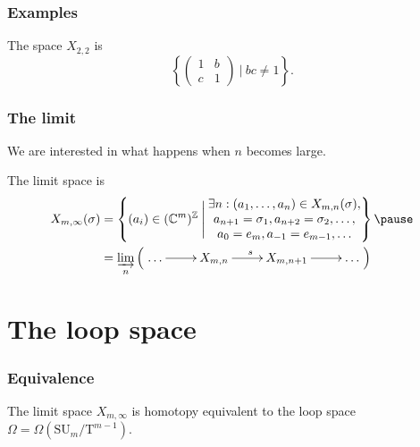\documentclass{beamer} %
\newcommand{\Z}{\mathbb{Z}}
\newcommand{\C}{\mathbb{C}}
\newcommand{\delim}{\:}
\newcommand{\SU}{\mathrm{SU}}
\newcommand{\T}{\mathrm{T}}
\newcommand{\set}[1]{\left\{ #1 \right\}}
\begin{document}
\begin{frame}
  \frametitle{Examples}
  \begin{example}
    The space $X_{2,2}$ is
    \[ \set{
      \begin{pmatrix}
        1 & b \\
        c & 1
      \end{pmatrix} \delim\bigg\vert\delim bc \neq 1 }.\]
  \end{example}
\end{frame}

\begin{frame}
  \frametitle{The limit}
  We are interested in what happens when $n$ becomes large.
  \begin{definition}
    The limit space is
    \begin{align*}
      X_{m,\infty}(\sigma) &= \set{(a_i) \in (\C^m)^\Z
                             \delim\Bigg\vert\delim
                             \begin{matrix}\exists n: (a_1,\dots,a_n)\in
                               X_{m,n}(\sigma), \\
                               a_{n+1} = \sigma_1,
                               a_{n+2}=\sigma_2,\dots,\\
                               a_0 = e_m, a_{-1} = e_{m-1},\dots
                             \end{matrix}} \pause\\
      &=
                     \varinjlim_{n} \left(
                     \xymatrix{
                       \dots \ar[r] & X_{m,n} \ar[r]^s & X_{m,n+1}
                       \ar[r] & \dots
                     } \right)
    \end{align*}
  \end{definition}
\end{frame}


\section{The loop space}


\begin{frame}
  \frametitle{Equivalence}
  \begin{theorem}
    The limit space $X_{m,\infty}$ is homotopy equivalent to the loop
    space $\Omega = \Omega(\SU_m/\T^{m-1})$.
  \end{theorem}
\end{frame}
\end{document}

